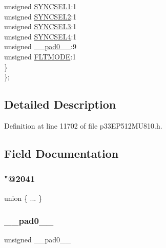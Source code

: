 \begin{DoxyCompactItemize}
\begin{tabbing}
\>\>unsigned \hyperlink{structtag_o_c9_c_o_n2_b_i_t_s_a50e73f95ab1c258ddc64f69c0991deaf}{SYNCSEL1}:1\\
\>\>unsigned \hyperlink{structtag_o_c9_c_o_n2_b_i_t_s_a304907a5d2c4cbf1114a54642a85951e}{SYNCSEL2}:1\\
\>\>unsigned \hyperlink{structtag_o_c9_c_o_n2_b_i_t_s_a6bbd1bd2ead6c9fa713969c6eb0f0c75}{SYNCSEL3}:1\\
\>\>unsigned \hyperlink{structtag_o_c9_c_o_n2_b_i_t_s_a0cd5bbe196c7974953909d27a6307bb7}{SYNCSEL4}:1\\
\>\>unsigned \hyperlink{structtag_o_c9_c_o_n2_b_i_t_s_adf71f3d8410c1f1dbbc96680a92c49af}{\_\_pad0\_\_}:9\\
\>\>unsigned \hyperlink{structtag_o_c9_c_o_n2_b_i_t_s_ad53c2a5303780172219bfd5e0100c782}{FLTMODE}:1\\
\>\} \\
\}; \\

\end{tabbing}\end{DoxyCompactItemize}


\subsection{Detailed Description}


Definition at line 11702 of file p33\+E\+P512\+M\+U810.\+h.



\subsection{Field Documentation}
\mbox{\label{structtag_o_c9_c_o_n2_b_i_t_s_a0962112c24129d583f6a80270e29f075}} 
\subsubsection{\texorpdfstring{"@2041}{@2041}}
{\footnotesize\ttfamily union \{ ... \} }

\mbox{\label{structtag_o_c9_c_o_n2_b_i_t_s_adf71f3d8410c1f1dbbc96680a92c49af}} 
\subsubsection{\texorpdfstring{\+\_\+\+\_\+pad0\+\_\+\+\_\+}{\_\_pad0\_\_}}
{\footnotesize\ttfamily unsigned \+\_\+\+\_\+pad0\+\_\+\+\_\+}



